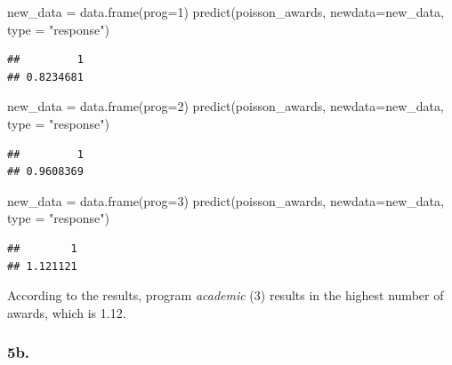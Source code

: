 \documentclass[
]{article}
\newenvironment{Shaded}{\begin{snugshade}}{\end{snugshade}}
\newcommand{\AttributeTok}[1]{\textcolor[rgb]{0.77,0.63,0.00}{#1}}
\newcommand{\DecValTok}[1]{\textcolor[rgb]{0.00,0.00,0.81}{#1}}
\newcommand{\FunctionTok}[1]{\textcolor[rgb]{0.00,0.00,0.00}{#1}}
\newcommand{\NormalTok}[1]{#1}
\newcommand{\OtherTok}[1]{\textcolor[rgb]{0.56,0.35,0.01}{#1}}
\newcommand{\SpecialCharTok}[1]{\textcolor[rgb]{0.00,0.00,0.00}{#1}}
\newcommand{\StringTok}[1]{\textcolor[rgb]{0.31,0.60,0.02}{#1}}
\begin{document}
\begin{Shaded}
\begin{Highlighting}[]
\NormalTok{new\_data }\OtherTok{=} \FunctionTok{data.frame}\NormalTok{(}\AttributeTok{prog=}\DecValTok{1}\NormalTok{)}
\FunctionTok{predict}\NormalTok{(poisson\_awards, }\AttributeTok{newdata=}\NormalTok{new\_data, }\AttributeTok{type =} \StringTok{"response"}\NormalTok{)}
\end{Highlighting}
\end{Shaded}

\begin{verbatim}
##         1 
## 0.8234681
\end{verbatim}

\begin{Shaded}
\begin{Highlighting}[]
\NormalTok{new\_data }\OtherTok{=} \FunctionTok{data.frame}\NormalTok{(}\AttributeTok{prog=}\DecValTok{2}\NormalTok{)}
\FunctionTok{predict}\NormalTok{(poisson\_awards, }\AttributeTok{newdata=}\NormalTok{new\_data, }\AttributeTok{type =} \StringTok{"response"}\NormalTok{)}
\end{Highlighting}
\end{Shaded}

\begin{verbatim}
##         1 
## 0.9608369
\end{verbatim}

\begin{Shaded}
\begin{Highlighting}[]
\NormalTok{new\_data }\OtherTok{=} \FunctionTok{data.frame}\NormalTok{(}\AttributeTok{prog=}\DecValTok{3}\NormalTok{)}
\FunctionTok{predict}\NormalTok{(poisson\_awards, }\AttributeTok{newdata=}\NormalTok{new\_data, }\AttributeTok{type =} \StringTok{"response"}\NormalTok{)}
\end{Highlighting}
\end{Shaded}

\begin{verbatim}
##        1 
## 1.121121
\end{verbatim}

According to the results, program \emph{academic} (3) results in the
highest number of awards, which is 1.12.

\hypertarget{b.-2}{%
\subsubsection{5b.}\label{b.-2}}

\begin{Shaded}
\end{Shaded}
\end{document}
